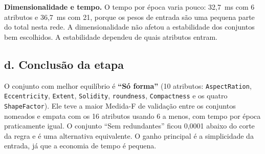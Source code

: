\textbf{Dimensionalidade e tempo.} O tempo por época varia pouco: 32,7~ms com 6 atributos e 36,7~ms com 21, porque os pesos de entrada são uma pequena parte do total nesta rede. A dimensionalidade não afetou a estabilidade dos conjuntos bem escolhidos. A estabilidade dependeu de quais atributos entram.

\subsection*{d. Conclusão da etapa}

O conjunto com melhor equilíbrio é \textbf{``Só forma''} (10 atributos: \texttt{AspectRation}, \texttt{Eccentricity}, \texttt{Extent}, \texttt{Solidity}, \texttt{roundness}, \texttt{Compactness} e os quatro \texttt{ShapeFactor}). Ele teve a maior Medida-F de validação entre os conjuntos nomeados
e empata com os 16 atributos usando 6 a menos, com tempo por época praticamente igual. O conjunto ``Sem redundantes'' ficou 0,0001 abaixo do corte da regra e é uma alternativa equivalente. O ganho principal é a simplicidade da entrada, já que a economia de tempo é pequena.

\FloatBarrier
